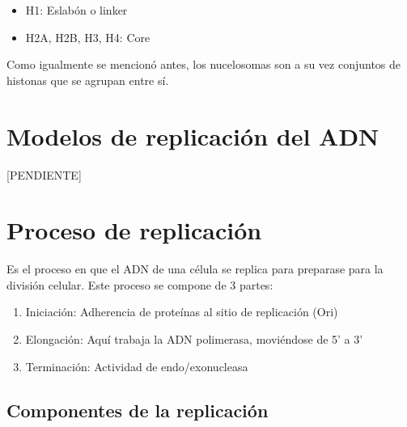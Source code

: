\begin{itemize}
    \item H1: Eslabón o linker
    \item H2A, H2B, H3, H4: Core
\end{itemize}

Como igualmente se mencionó antes, los nucelosomas son a su vez conjuntos de histonas que se agrupan entre sí.

\section{Modelos de replicación del ADN}

[PENDIENTE]

\section{Proceso de replicación} %

Es el proceso en que el ADN de una célula se replica para preparase para la división celular. Este proceso se compone de 3 partes:

\begin{enumerate}
    \item Iniciación: Adherencia de proteínas al sitio de replicación (Ori)
    \item Elongación: Aquí trabaja la ADN polimerasa, moviéndose de 5' a 3'
    \item Terminación: Actividad de endo/exonucleasa
\end{enumerate}

\subsection{Componentes de la replicación}

